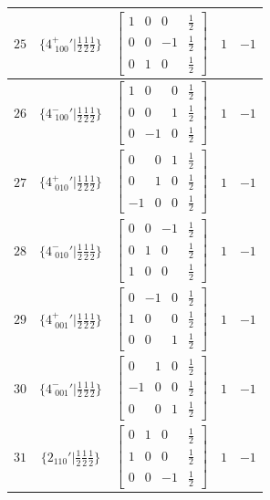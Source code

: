 \documentclass[fleqn,8pt]{jsarticle}
\begin{document}
\begin{longtable}{ccccc}
$ 25 $ & $ \{4^{+}_{\,\,100}{}'|\frac{1}{2} \frac{1}{2} \frac{1}{2}\} $ & $ \begin{bmatrix} 1 & 0 & 0 & \frac{1}{2} \\ 0 & 0 & -1 & \frac{1}{2} \\ 0 & 1 & 0 & \frac{1}{2} \end{bmatrix} $ & $ 1 $ & $ -1 $ \\ \hline
$ 26 $ & $ \{4^{-}_{\,\,100}{}'|\frac{1}{2} \frac{1}{2} \frac{1}{2}\} $ & $ \begin{bmatrix} 1 & 0 & 0 & \frac{1}{2} \\ 0 & 0 & 1 & \frac{1}{2} \\ 0 & -1 & 0 & \frac{1}{2} \end{bmatrix} $ & $ 1 $ & $ -1 $ \\ \hline
$ 27 $ & $ \{4^{+}_{\,\,010}{}'|\frac{1}{2} \frac{1}{2} \frac{1}{2}\} $ & $ \begin{bmatrix} 0 & 0 & 1 & \frac{1}{2} \\ 0 & 1 & 0 & \frac{1}{2} \\ -1 & 0 & 0 & \frac{1}{2} \end{bmatrix} $ & $ 1 $ & $ -1 $ \\ \hline
$ 28 $ & $ \{4^{-}_{\,\,010}{}'|\frac{1}{2} \frac{1}{2} \frac{1}{2}\} $ & $ \begin{bmatrix} 0 & 0 & -1 & \frac{1}{2} \\ 0 & 1 & 0 & \frac{1}{2} \\ 1 & 0 & 0 & \frac{1}{2} \end{bmatrix} $ & $ 1 $ & $ -1 $ \\ \hline
$ 29 $ & $ \{4^{+}_{\,\,001}{}'|\frac{1}{2} \frac{1}{2} \frac{1}{2}\} $ & $ \begin{bmatrix} 0 & -1 & 0 & \frac{1}{2} \\ 1 & 0 & 0 & \frac{1}{2} \\ 0 & 0 & 1 & \frac{1}{2} \end{bmatrix} $ & $ 1 $ & $ -1 $ \\ \hline
$ 30 $ & $ \{4^{-}_{\,\,001}{}'|\frac{1}{2} \frac{1}{2} \frac{1}{2}\} $ & $ \begin{bmatrix} 0 & 1 & 0 & \frac{1}{2} \\ -1 & 0 & 0 & \frac{1}{2} \\ 0 & 0 & 1 & \frac{1}{2} \end{bmatrix} $ & $ 1 $ & $ -1 $ \\ \hline
$ 31 $ & $ \{2{}_{110}{}'|\frac{1}{2} \frac{1}{2} \frac{1}{2}\} $ & $ \begin{bmatrix} 0 & 1 & 0 & \frac{1}{2} \\ 1 & 0 & 0 & \frac{1}{2} \\ 0 & 0 & -1 & \frac{1}{2} \end{bmatrix} $ & $ 1 $ & $ -1 $ \\ \hline

\end{longtable}
\end{document}
